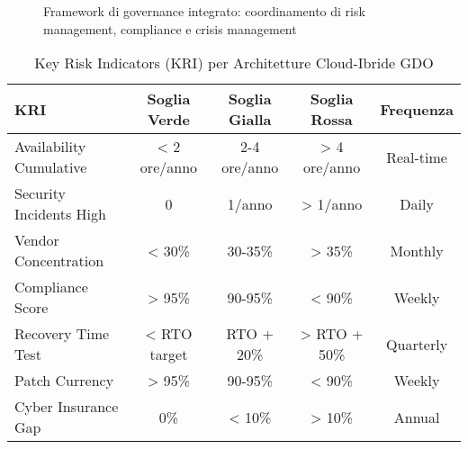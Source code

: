 \documentclass[12pt,a4paper]{article}
\begin{document}
\begin{figure}[htbp]
\caption{Framework di governance integrato: coordinamento di risk management, compliance e crisis management}
\label{fig:integrated_governance_framework}
\end{figure}


\begin{table}[htbp]
\centering
\caption{Key Risk Indicators (KRI) per Architetture Cloud-Ibride GDO}
\label{tab:key_risk_indicators}
\begin{tabular}{@{}lcccc@{}}
\toprule
\textbf{KRI} & \textbf{Soglia Verde} & \textbf{Soglia Gialla} & \textbf{Soglia Rossa} & \textbf{Frequenza} \\
\midrule
Availability Cumulative & < 2 ore/anno & 2-4 ore/anno & > 4 ore/anno & Real-time \\
\addlinespace
Security Incidents High & 0 & 1/anno & > 1/anno & Daily \\
\addlinespace
Vendor Concentration & < 30\% & 30-35\% & > 35\% & Monthly \\
\addlinespace
Compliance Score & > 95\% & 90-95\% & < 90\% & Weekly \\
\addlinespace
Recovery Time Test & < RTO target & RTO + 20\% & > RTO + 50\% & Quarterly \\
\addlinespace
Patch Currency & > 95\% & 90-95\% & < 90\% & Weekly \\
\addlinespace
Cyber Insurance Gap & 0\% & < 10\% & > 10\% & Annual \\
\bottomrule
\end{tabular}
\end{table}

\end{document}
